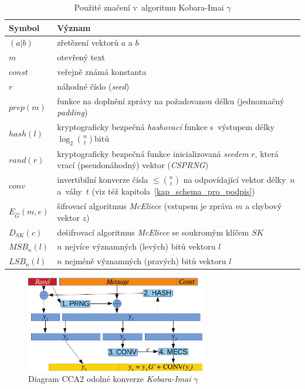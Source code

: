 \documentclass[thesis=M,czech,hidelinks]{FITthesis}[2012/06/26]
\newcommand{\0}{{\textcolor[gray]{0.75}{0}}}
\begin{document}
\begin{table}[!ht]
    \centering
    \begin{tabular}{l p{10cm}}
        Symbol          &   Význam \\
        \hline
        $(a|b)$         &   zřetězení vektorů $a$ a $b$ \\
        $m$             &   otevřený text \\
        $const$         &   veřejně známá konstanta \\
        $r$             &   náhodné číslo (\emph{seed}) \\
        $prep(m)$       &   funkce na doplnění zprávy na požadovanou délku
                            (jednoznačný \emph{padding}) \\
        $hash(l)$       &   kryptograficky bezpečná \emph{hashovací} funkce
                            s~výstupem délky $\log_2 \binom{n}{t}$\;bitů \\
        $rand(r)$       &   kryptograficky bezpečná funkce inicializovaná
                            \emph{seedem} $r$, která vrací (pseudonáhodný) vektor
                            (\emph{CSPRNG}) \\
        $conv$          &   invertibilní konverze čísla $\leq \binom{n}{t}$ na
                            odpovídající vektor délky~$n$ a~váhy~$t$ (viz též
                            kapitola~\ref{kap_schema_pro_podpis}) \\
        $E_{\hat{G}}(m,e)$
                        &   šifrovací algoritmus \emph{McEliece} (vstupem je
                            zpráva $m$ a chybový vektor $z$) \\
        $D_{SK}(c)$     &   dešifrovací algoritmus \emph{McEliece} se soukromým
                            klíčem $SK$ \\
        $MSB_n(l)$      &   $n$ nejvíce významných (levých) bitů vektoru $l$ \\
        $LSB_n(l)$      &   $n$ nejméně významných (pravých) bitů vektoru $l$ \\
    \end{tabular}
    \caption[Značení v~CCA2 odolné konverzi $\gamma$]{
        Použité značení v~algoritmu Kobara-Imai $\gamma$
    }
    \label{tab_znaceni_cca2}
\end{table}

\begin{figure}[!ht]
    \centering
    \includegraphics[width=0.7\textwidth]{materialy/kobara-imai-cca2.png}
    \caption[CCA2 odolná konverze]{Diagram CCA2 odolné konverze \emph{Kobara-Imai}
    $\gamma$~\cite{Repka,Kobara}}
    \label{obr_cca2}
\end{figure}
\end{document}

